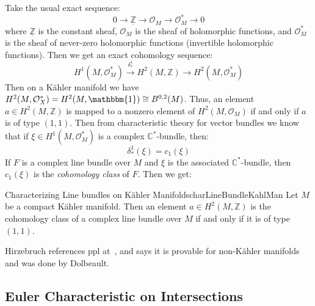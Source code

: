 \documentclass{book}
\newcommand{\C}{{\mathbb{C}}}
\newcommand{\Z}{{\mathbb{Z}}}
\newcommand{\CO}{{\mathcal{O}}}
\begin{document}
Take the usual exact sequence:
\[
  0 \to \underline{\Z} \to \CO_M \to \CO_M^* \to 0
\]
where $\underline{\Z}$ is the constant sheaf, $\CO_M$ is the sheaf of holomorphic functions, and $\CO_M^*$ is
the sheaf of never-zero holomorphic functions (invertible holomorphic functions). Then we get an exact
cohomology sequence:
\[
  H^1(M, \CO_M^*) \xrightarrow{\delta_*^1} H^2(M, \Z) \to H^2(M, \CO_M^*)
\]
Then on a K\"ahler manifold we have $H^2(M, \CO_X^*) = H^2(M, \mathbbm{1}) \cong B^{0,2}(M)$. Thus, an element
$a \in H^2(M, \Z)$ is mapped to a nonzero element of $H^2(M, \CO_M)$ if and only if $a$ is of type $(1,1)$.
Then from characteristic theory for vector bundles we know that if $\xi \in H^1(M, \CO_M^*)$ is a complex
$\C^*$-bundle, then:
\[
  \delta_*^1(\xi) = c_1(\xi)
\]
If $F$ is a complex line bundle over $M$ and $\xi$ is the associated $\C^*$-bundle, then $c_1(\xi)$ is the
\emph{cohomology class} of $F$. Then we get:

\begin{thm}{Characterizing Line bundles on K\"ahler Manifolds}{charLineBundleKahlMan}
  Let $M$ be a compact K\"ahler manifold. Then an element $a \in H^2(M, \Z)$ is the cohomology class of
  a complex line bundle over $M$ if and only if it is of type $(1,1)$.
\end{thm}

\begin{Proof}
  Hirzebruch references ppl at~\cite[p.127, Thm~15.9.1]{hirzebruchTopologicalMethodsAlgebraic1995}, and
  says it is provable for non-K\"ahler manifolds and was done by Dolbeault.
\end{Proof}

\subsection{Euler Characteristic on Intersections}\label{sec:propGenerlizedEulerChar}
\end{document}
